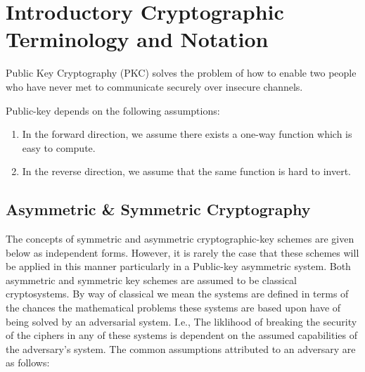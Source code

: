 \section{Introductory Cryptographic Terminology and Notation}


Public Key Cryptography (PKC) solves the problem of how to enable two people who have never met to communicate securely over insecure channels. 
 

Public-key depends on the following assumptions: 
\begin{enumerate}
 \item In the forward direction, we assume there exists a one-way function which is easy to compute.
 \item In the reverse direction, we assume that the same function is hard to invert.
 \end{enumerate}
 
 
 

\subsection{Asymmetric \& Symmetric Cryptography} 

The concepts of symmetric and asymmetric cryptographic-key schemes are given below as independent forms. However, it is rarely the case that these schemes will be applied in this manner particularly in a Public-key asymmetric system. Both asymmetric and symmetric key schemes are assumed to be classical cryptosystems. By way of classical we mean the systems are defined in terms of the chances the mathematical problems these systems are based upon have of being solved by an adversarial system. I.e., The liklihood of breaking the security of the ciphers in any of these systems is dependent on the assumed capabilities of the adversary's system. The common assumptions attributed to an adversary are as follows:

